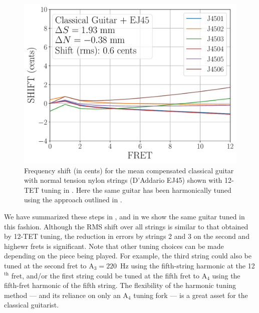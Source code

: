  \begin{figure}
  \centering
  \includegraphics[width=5.0in]{../figures/shift_classicalguitar_ej45_harmonic}
  \caption{\label{fig:shift_classicalguitar_ej45_harmonic} Frequency shift (in cents) for the mean compensated classical guitar with normal tension nylon strings (D'Addario EJ45) shown with 12-TET tuning in . Here the same guitar has been harmonically tuned using the approach outlined in .}
\end{figure}

 We have summarized these steps in , and in  we show the same guitar tuned in this fashion. Although the RMS shift over all strings is similar to that obtained by 12-TET tuning, the reduction in errors by strings 2 and 3 on the second and highewr frets is significant. Note that other tuning choices can be made depending on the piece being played. For example, the third string could also be tuned at the second fret to A$_3 = 220$~Hz using the fifth-string harmonic at the 12$^\text{th}$ fret, and/or the first string could be tuned at the fifth fret to A$_4$ using the fifth-fret harmonic of the fifth string. The flexibility of the harmonic tuning method --- and its reliance on only an A$_4$ tuning fork --- is a great asset for the classical guitarist.



